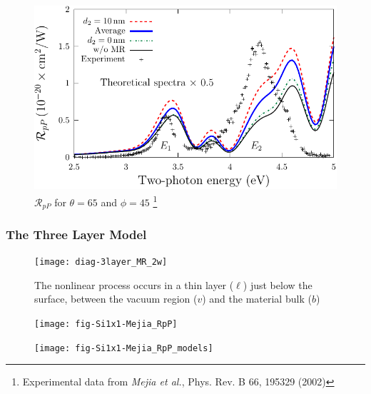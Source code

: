 \documentclass{beamer}
\begin{document}
\begin{frame}
\begin{figure}
\centering
\includegraphics[width=\textwidth]{fig-Si1x1-MRdepth}
\caption{$\mathcal{R}_{pP}$ for $\theta=65$ and $\phi=45$%
\footnote{Experimental data from \emph{Mejia et al.}, Phys. Rev. B 66, 195329 (2002)}}
\end{figure}
\end{frame}

\begin{frame}
\frametitle{The Three Layer Model}
\begin{figure}
\centering
\texttt{[image: diag-3layer\_MR\_2w]}
\caption{The nonlinear process occurs in a thin layer ($\ell$) just below the
surface, between the vacuum region ($v$) and the material bulk ($b$)}
\end{figure}
\end{frame}

\begin{frame}
\begin{figure}
\raggedright
\texttt{[image: fig-Si1x1-Mejia\_RpP]}
\end{figure}
\vspace{-0.5cm}
\begin{figure}
\raggedleft
\texttt{[image: fig-Si1x1-Mejia\_RpP\_models]}
\end{figure}
\end{frame}
\end{document}

